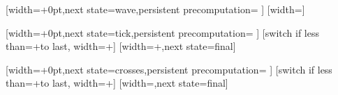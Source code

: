%

{
  [width=+0pt,next state=wave,persistent precomputation={
    \edef\pgf@lib@dec@ol{\pgfmathresult pt}
  }]{}  
  [width=\pgfdecorationsegmentlength]
  {
    \pgftransformxshift{+\pgfdecorationsegmentlength}
    \pgfpathmoveto{
      \pgfpointadd
      {\pgfqpoint{-\pgf@lib@dec@ol}{0pt}}%
      {\pgfpointpolar{\pgfdecorationsegmentangle}{+\pgf@lib@dec@ol}}}%
    \pgfpatharc{\pgfdecorationsegmentangle}{-\pgfdecorationsegmentangle}{+\pgf@lib@dec@ol}%
  }
  {
    \pgfpathmoveto{\pgfpointdecoratedpathlast}
  }
}



%

{
  [width=+0pt,next state=tick,persistent precomputation={
    \edef\pgf@lib@dec@ol{\pgfmathresult pt}
  }]{}  
  [switch if less than=+\pgfdecorationsegmentlength to last,
               width=+\pgfdecorationsegmentlength]
  {
    \pgfpathmoveto{\pgfpointorigin}
    \pgfpathlineto{\pgfpointpolar{\pgfdecorationsegmentangle}{+\pgfdecorationsegmentamplitude}}
  }
  [width=+\pgfdecorationsegmentamplitude,next state=final]
  {
    \pgfpathmoveto{\pgfpointorigin}
    \pgfpathlineto{\pgfpointpolar{\pgfdecorationsegmentangle}{+\pgfdecorationsegmentamplitude}}
  }  
  {
    \pgfpathmoveto{\pgfpointdecoratedpathlast}
  }
}




%

{
  [width=+0pt,next state=crosses,persistent precomputation={
    \edef\pgf@lib@dec@ol{\pgfmathresult pt}
  }]{}  
  [switch if less than=+\pgfdecorationsegmentlength to last,
                   width=+\pgfdecorationsegmentlength]
  {
    \pgfpathmoveto{\pgfqpoint{0pt}{\pgfdecorationsegmentamplitude}}
    \pgfpathlineto{\pgfqpoint{\pgf@lib@dec@ol}{-\pgfdecorationsegmentamplitude}}
    \pgfpathmoveto{\pgfqpoint{0pt}{-\pgfdecorationsegmentamplitude}}
    \pgfpathlineto{\pgfqpoint{\pgf@lib@dec@ol}{\pgfdecorationsegmentamplitude}}
  }
  [width=\pgf@lib@dec@ol,next state=final]
  {
    \pgfpathmoveto{\pgfqpoint{0pt}{\pgfdecorationsegmentamplitude}}
    \pgfpathlineto{\pgfqpoint{\pgf@lib@dec@ol}{-1\pgfdecorationsegmentamplitude}}
    \pgfpathmoveto{\pgfqpoint{0pt}{-\pgfdecorationsegmentamplitude}}
    \pgfpathlineto{\pgfqpoint{\pgf@lib@dec@ol}{\pgfdecorationsegmentamplitude}}
  }
  {
    \pgfpathmoveto{\pgfpointdecoratedpathlast}
  }
}






